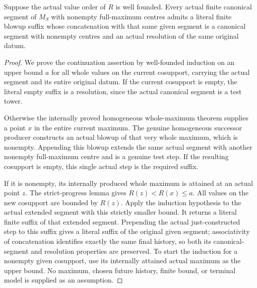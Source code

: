 \begin{theorem}
\label{hir:homogeneous-actual-finite-canonical-resolution-suffix}
Suppose the actual value order of $R$ is well founded. Every actual
finite canonical segment of $M_S$ with nonempty full-maximum centres
admits a literal finite blowup suffix whose concatenation with that
same given segment is a canonical segment with nonempty centres and
an actual resolution of the same original datum.
\leanok
{}
\end{theorem}
\begin{proof}
We prove the continuation assertion by well-founded induction on an
upper bound $a$ for all whole values on the current cosupport, carrying
the actual segment and its entire original datum. If the current
cosupport is empty, the literal empty suffix is a resolution, since
the actual canonical segment is a test tower.

Otherwise the internally proved homogeneous whole-maximum theorem
supplies a point $x$ in the entire current maximum. The genuine
homogeneous successor producer constructs an actual blowup of that
very whole maximum, which is nonempty. Appending this blowup extends
the same actual segment with another nonempty full-maximum centre and
is a genuine test step. If the resulting cosupport is empty, this
single actual step is the required suffix.

If it is nonempty, its internally produced whole maximum is attained
at an actual point $z$. The strict-progress lemma gives
$R(z)<R(x)\leq a$. All values on the new cosupport are bounded by
$R(z)$. Apply the induction hypothesis to the actual extended segment
with this strictly smaller bound. It returns a literal finite suffix
of that extended segment. Prepending the actual just-constructed step
to this suffix gives a literal suffix of the original given segment;
associativity of concatenation identifies exactly the same final
history, so both its canonical-segment and resolution properties are
preserved. To start the induction for a nonempty given cosupport, use
its internally attained actual maximum as the upper bound. No maximum,
chosen future history, finite bound, or terminal model is supplied as
an assumption.
\end{proof}

